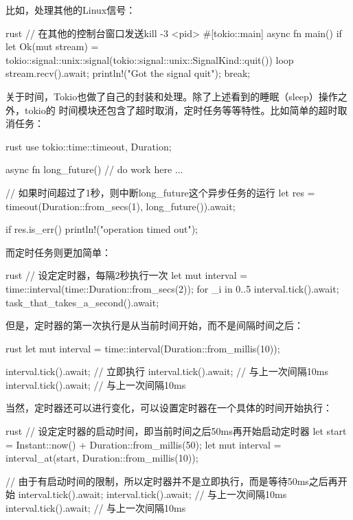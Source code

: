 比如，处理其他的Linux信号：
\begin{code-block}{rust}
// 在其他的控制台窗口发送kill -3 <pid>
#[tokio::main]
async fn main() {
    if let Ok(mut stream) = tokio::signal::unix::signal(tokio::signal::unix::SignalKind::quit()) {
        loop {
            stream.recv().await;
            println!("Got the signal quit");
            break;
        }
    }
}
\end{code-block}

关于时间，Tokio也做了自己的封装和处理。除了上述看到的睡眠（sleep）操作之外，tokio的
时间模块还包含了超时取消，定时任务等等特性。比如简单的超时取消任务：
\begin{code-block}{rust}
use tokio::time::{timeout, Duration};

async fn long_future() {
    // do work here
    ...
}

// 如果时间超过了1秒，则中断long_future这个异步任务的运行
let res = timeout(Duration::from_secs(1), long_future()).await;

if res.is_err() {
    println!("operation timed out");
}
\end{code-block}

而定时任务则更加简单：
\begin{code-block}{rust}
// 设定定时器，每隔2秒执行一次
let mut interval = time::interval(time::Duration::from_secs(2));
for _i in 0..5 {
    interval.tick().await;
    task_that_takes_a_second().await;
}
\end{code-block}

但是，定时器的第一次执行是从当前时间开始，而不是间隔时间之后：
\begin{code-block}{rust}
let mut interval = time::interval(Duration::from_millis(10));

interval.tick().await; // 立即执行
interval.tick().await; // 与上一次间隔10ms
interval.tick().await; // 与上一次间隔10ms
\end{code-block}

当然，定时器还可以进行变化，可以设置定时器在一个具体的时间开始执行：
\begin{code-block}{rust}
// 设定定时器的启动时间，即当前时间之后50ms再开始启动定时器
let start = Instant::now() + Duration::from_millis(50);
let mut interval = interval_at(start, Duration::from_millis(10));

// 由于有启动时间的限制，所以定时器并不是立即执行，而是等待50ms之后再开始
interval.tick().await;
interval.tick().await; // 与上一次间隔10ms
interval.tick().await; // 与上一次间隔10ms
\end{code-block}

